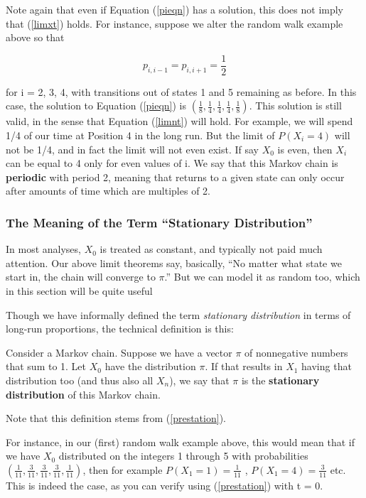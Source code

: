 Note again that even if Equation (\ref{pieqn}) has a solution, this does
not imply that (\ref{limxt}) holds. For instance, suppose we alter the
random walk example above so that

\begin{equation}
p_{i,i-1}=p_{i,i+1}=\frac{1}{2}
\end{equation}  

for i = 2, 3, 4, with transitions out of states 1 and 5 remaining as
before.  In this case, the solution to Equation (\ref{pieqn}) is
$(\frac{1}{8},\frac{1}{4},\frac{1}{4},\frac{1}{4},\frac{1}{8})$.  This
solution is still valid, in the sense that Equation (\ref{limnt}) will
hold. For example, we will spend 1/4 of our time at Position 4 in the
long run.  But the limit of $P(X_{i}=4)$ will not be 1/4, and in fact
the limit will not even exist. If say $X_{0}$ is even, then $X_{i}$ can
be equal to 4 only for even values of i.  We say that this Markov chain
is {\bf periodic} with period 2, meaning that returns to a given state
can only occur after amounts of time which are multiples of 2.

\subsubsection{The Meaning of the Term ``Stationary Distribution''}
\label{stationmeaning}

In most analyses, $X_0$ is treated as constant, and typically not paid
much attention.  Our above limit theorems say, basically, ``No matter
what state we start in, the chain will converge to $\pi$.''  But we can
model it as random too, which in this section will be quite useful

Though we have informally defined the term {\it stationary distribution}
in terms of long-run proportions, the technical definition is this:

\begin{definition}  Consider a Markov chain.  Suppose we have a 
vector $\pi$ of nonnegative numbers that sum to 1.
Let $X_0$ have the distribution $\pi$.  If that results in $X_1$ having
that distribution too (and thus also all $X_n$), we say that $\pi$ 
is the {\bf stationary distribution} of this Markov chain.
\end{definition}

Note that this definition stems from (\ref{prestation}).

For instance, in our (first) random walk example above, this would mean
that if we have $X_0$ distributed on the integers 1 through 5 with
probabilities
$(\frac{1}{11},\frac{3}{11},\frac{3}{11},\frac{3}{11},\frac{1}{11})$,
then for example $P(X_1 = 1) = \frac{1}{11}$ , $P(X_1 = 4) =
\frac{3}{11}$ etc.  This is indeed the case, as you can verify using
(\ref{prestation}) with t = 0.

